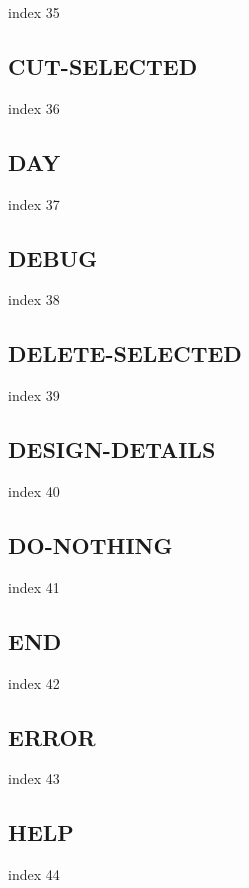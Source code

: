 \documentclass[a4paper]{report}
\begin{document}
index 35

\subsection{CUT-SELECTED}

index 36

\subsection{DAY}

index 37

\subsection{DEBUG}

index 38

\subsection{DELETE-SELECTED}

index 39

\subsection{DESIGN-DETAILS}

index 40

\subsection{DO-NOTHING}

index 41

\subsection{END}

index 42

\subsection{ERROR}

index 43

\subsection{HELP}

index 44
\end{document}
